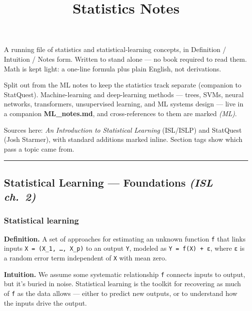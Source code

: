 \documentclass[
  10pt,
  letterpaper,
  onecolumn]{article}
\title{Statistics Notes}
\author{}
\date{}
\begin{document}
\maketitle

{
\hypersetup{linkcolor=black}
\setcounter{tocdepth}{2}
\tableofcontents
}
A running file of statistics and statistical-learning concepts, in
Definition / Intuition / Notes form. Written to stand alone --- no book
required to read them. Math is kept light: a one-line formula plus plain
English, not derivations.

Split out from the ML notes to keep the statistics track separate
(companion to StatQuest). Machine-learning and deep-learning methods ---
trees, SVMs, neural networks, transformers, unsupervised learning, and
ML systems design --- live in a companion \textbf{ML\_notes.md}, and
cross-references to them are marked \emph{(ML)}.

Sources here: \emph{An Introduction to Statistical Learning} (ISL/ISLP)
and StatQuest (Josh Starmer), with standard additions marked inline.
Section tags show which pass a topic came from.

\begin{center}\rule{0.5\linewidth}{0.5pt}\end{center}

\hypertarget{statistical-learning-foundations-isl-ch.-2}{%
\subsection{\texorpdfstring{Statistical Learning --- Foundations
\emph{(ISL
ch.~2)}}{Statistical Learning --- Foundations (ISL ch.~2)}}\label{statistical-learning-foundations-isl-ch.-2}}

\hypertarget{statistical-learning}{%
\subsubsection{Statistical learning}\label{statistical-learning}}

\textbf{Definition.} A set of approaches for estimating an unknown
function \texttt{f} that links inputs \texttt{X\ =\ (X\_1,\ …,\ X\_p)}
to an output \texttt{Y}, modeled as \texttt{Y\ =\ f(X)\ +\ ε}, where
\texttt{ε} is a random error term independent of \texttt{X} with mean
zero.

\textbf{Intuition.} We assume some systematic relationship \texttt{f}
connects inputs to output, but it's buried in noise. Statistical
learning is the toolkit for recovering as much of \texttt{f} as the data
allows --- either to predict new outputs, or to understand how the
inputs drive the output.
\end{document}
